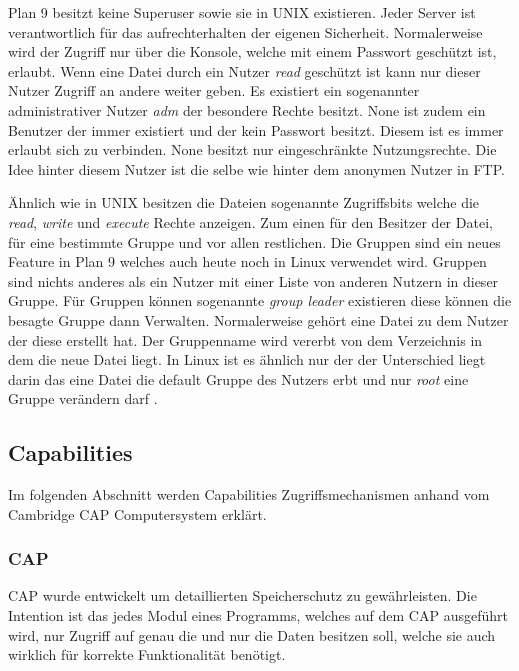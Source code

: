 \documentclass[11pt,technote]{IEEEtran}
\begin{document}
        Plan 9 besitzt keine Superuser sowie sie in UNIX existieren. Jeder Server ist verantwortlich f\"ur das aufrechterhalten der eigenen Sicherheit.
        Normalerweise wird der Zugriff nur \"uber die Konsole, welche mit einem Passwort gesch\"utzt ist, erlaubt.
        Wenn eine Datei durch ein Nutzer \textit{read} gesch\"utzt ist kann nur dieser Nutzer Zugriff an andere weiter geben.
        Es existiert ein sogenannter administrativer Nutzer \textit{adm} der besondere Rechte besitzt. 
        None ist zudem ein Benutzer der immer existiert und der kein Passwort besitzt.
        Diesem ist es immer erlaubt sich zu verbinden. None besitzt nur eingeschr\"ankte Nutzungsrechte. Die Idee hinter diesem Nutzer ist die selbe
        wie hinter dem anonymen Nutzer in FTP.
       
        \"Ahnlich wie in UNIX besitzen die Dateien sogenannte Zugriffsbits welche die \textit{read}, \textit{write} und \textit{execute} Rechte anzeigen. 
         Zum einen f\"ur den Besitzer der Datei, f\"ur eine bestimmte Gruppe und vor allen restlichen.
         Die Gruppen sind ein neues Feature in Plan 9 welches auch heute noch in Linux verwendet wird. Gruppen sind nichts anderes
         als ein Nutzer mit einer Liste von anderen Nutzern in dieser Gruppe. F\"ur Gruppen k\"onnen sogenannte \textit{group leader} existieren diese k\"onnen die
         besagte Gruppe dann Verwalten. Normalerweise geh\"ort eine Datei zu dem Nutzer der diese erstellt hat. 
         Der Gruppenname wird vererbt von dem Verzeichnis in dem die neue Datei liegt. In Linux ist es \"ahnlich nur der der Unterschied liegt darin
         das eine Datei die default Gruppe des Nutzers erbt und nur \textit{root} eine Gruppe ver\"andern darf \cite{Url:linux:groups} \cite{Url:linux:groupmod}.
    \subsection{Capabilities} \label{sec:secure:capability}
      Im folgenden Abschnitt werden Capabilities Zugriffsmechanismen anhand vom Cambridge CAP Computersystem erkl\"art.
      \subsubsection{CAP}
		     CAP wurde entwickelt um detaillierten Speicherschutz zu gew\"ahrleisten. Die Intention ist das jedes Modul eines Programms,
		     welches auf dem CAP ausgef\"uhrt wird, nur Zugriff auf genau die und nur die Daten besitzen soll,
		     welche sie auch wirklich f\"ur korrekte Funktionalit\"at ben\"otigt.
		     
\end{document}
